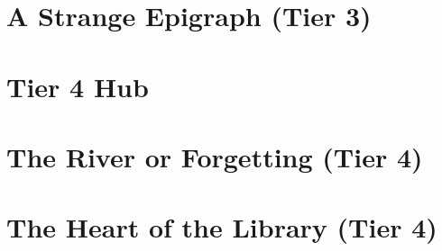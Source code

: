 \documentclass[sheet]{GL2020}
\begin{document}
\section*{A Strange Epigraph (Tier 3)}
\label{StrangeEpigraph}

\clearpage

\section*{Tier 4 Hub}
\label{TierFourHub}

\clearpage

\section*{The River or Forgetting (Tier 4)}
\label{RiverofForgetting}

\clearpage

\section*{The Heart of the Library (Tier 4)}
\label{HeartoftheLibrary}

\clearpage
\end{document}
